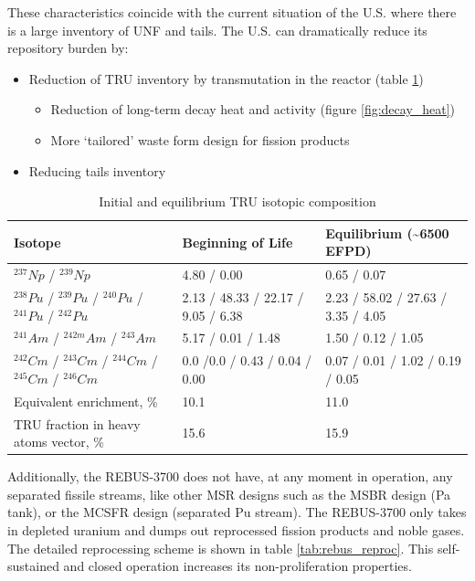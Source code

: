These characteristics coincide with the current situation of
the U.S. where there is a large inventory of \gls{UNF}
and tails. The U.S. can dramatically reduce its repository
burden by:
\begin{itemize}
	\item Reduction of \gls{TRU} inventory by transmutation in the reactor (table \ref{tab:rebus_comp})
	\begin{itemize}
		\item Reduction of long-term decay heat and activity (figure \ref{fig:decay_heat})
		\item More `tailored' waste form design for fission products
	\end{itemize}
	\item Reducing tails inventory
\end{itemize}


\begin{table}[h]
	\centering
	\caption{Initial and equilibrium \gls{TRU} isotopic composition \cite{mourogov_potentialities_2006}}
	\label{tab:rebus_comp}
	\begin{tabular}{lll}
		\hline
		Isotope & Beginning of Life & Equilibrium (\textasciitilde 6500 \gls{EFPD}) \\
		\hline
		$^{237} Np$ / $^{239} Np$ &  4.80 / 0.00 & 0.65 / 0.07 \\
		$^{238} Pu$ / $^{239} Pu$ / $^{240} Pu$ / $^{241} Pu$ / $^{242} Pu$ & 2.13 / 48.33 / 22.17 / 9.05 / 6.38 & 2.23 / 58.02 / 27.63 / 3.35 / 4.05 \\
		$^{241} Am$ / $^{242m} Am$ / $^{243} Am$ &5.17 / 0.01 / 1.48 & 1.50 / 0.12 / 1.05 \\
		$^{242} Cm$ / $^{243} Cm$ / $^{244} Cm$ / $^{245} Cm$ / $^{246} Cm$ & 0.0 /0.0 / 0.43 / 0.04 / 0.00 & 0.07 / 0.01 / 1.02 / 0.19 / 0.05 \\
		Equivalent enrichment, \% & 10.1 & 11.0 \\
		\gls{TRU} fraction in heavy atoms vector, \% & 15.6 & 15.9 \\
		\hline
	\end{tabular}
\end{table}

Additionally, the REBUS-3700 does not have, at any moment in
operation, any separated fissile streams, like other \gls{MSR} designs
such as the \gls{MSBR} design \cite{robertson_conceptual_1971} (Pa tank),
or the \gls{MCSFR} design \cite{smith_assessment_1974} (separated Pu stream).
The REBUS-3700 only takes in depleted uranium and dumps out reprocessed
fission products and noble gases. The detailed reprocessing scheme is shown
in table \ref{tab:rebus_reproc}. 
This self-sustained and closed operation increases its non-proliferation
properties.

